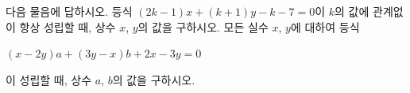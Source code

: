 다음 물음에 답하시오.
 등식 $(2k-1)x+(k+1)y-k-7=0$이 $k$의 값에 관계없이 항상 성립할 때, 상수 $x$, $y$의 값을 구하시오.
 모든 실수 $x$, $y$에 대하여 등식 \par\smallskip\centerline{$(x-2y)a+(3y-x)b+2x-3y=0$}\par\smallskip\noindent 이 성립할 때, 상수 $a$, $b$의 값을 구하시오.
